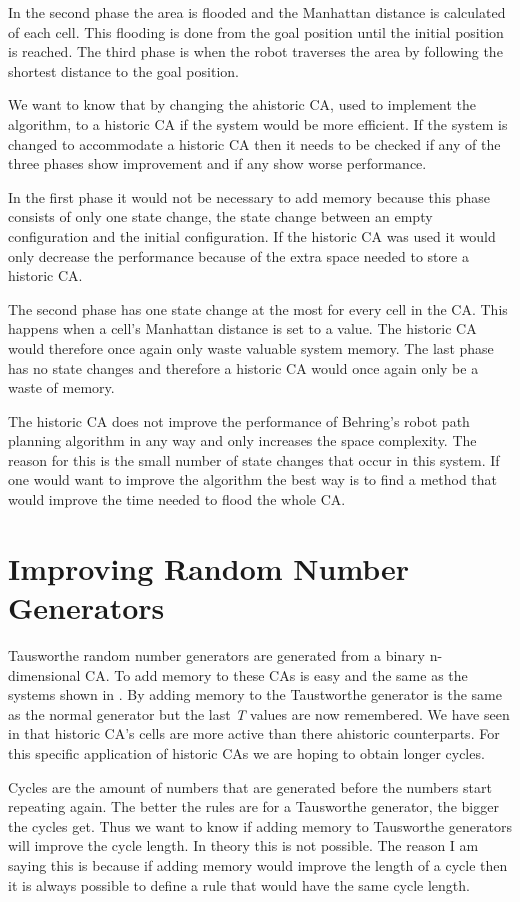 \documentclass[a4paper,11pt,titlepage]{article}
\begin{document}
In the second phase the area is flooded and the Manhattan distance is calculated of each cell. This flooding is done from the goal position until the initial position is reached. The third phase is when the robot traverses the area by following the shortest distance to the goal position.

We want to know that by changing the ahistoric CA, used to implement the algorithm, to a historic CA if the system would be more efficient. If the system is changed to accommodate a historic CA then it needs to be checked if any of the three phases show improvement and if any show worse performance.

In the first phase it would not be necessary to add memory because this phase consists of only one state change, the state change between an empty configuration and the initial configuration. If the historic CA was used it would only decrease the performance because of the extra space needed to store a historic CA.

The second phase has one state change at the most for every cell in the CA. This happens when a cell's Manhattan distance is set to a value. The historic CA would therefore once again only waste valuable system memory. The last phase has no state changes and therefore a historic CA would once again only be a waste of memory.

The historic CA does not improve the performance of Behring's robot path planning algorithm in any way and only increases the space complexity. The reason for this is the small number of state changes that occur in this system. If one would want to improve the algorithm the best way is to find a method that would improve the time needed to flood the whole CA.

\section{Improving Random Number Generators}
Tausworthe random number generators are generated from a binary n-dimensional CA. To add memory to these CAs is easy and the same as the systems shown in \cite{art}. By adding memory to the Taustworthe generator is the same as the normal generator but the last \emph{T} values are now remembered. We have seen in \cite{art} that historic CA's cells are more active than there ahistoric counterparts. For this specific application of historic CAs we are hoping to obtain longer cycles.

Cycles are the amount of numbers that are generated before the numbers start repeating again. The better the rules are for a Tausworthe generator, the bigger the cycles get. Thus we want to know if adding memory to Tausworthe generators will improve the cycle length. In theory this is not possible. The reason I am saying this is because if adding memory would improve the length of a cycle then it is always possible to define a rule that would have the same cycle length. 
\end{document}
